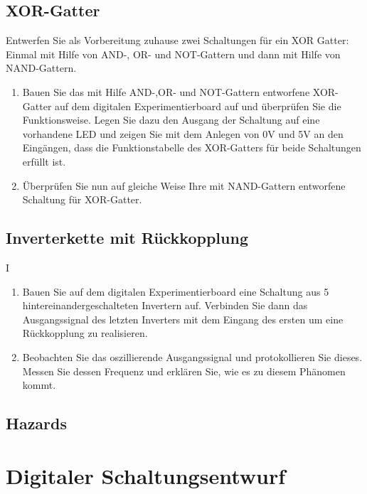 \documentclass[paper=a4, fontsize=11pt]{scrartcl}
\numberwithin{equation}{section}
\numberwithin{figure}{section}
\numberwithin{table}{section}
\begin{document}
\subsection{XOR-Gatter}

Entwerfen Sie als Vorbereitung zuhause zwei Schaltungen für ein XOR Gatter: Einmal mit Hilfe von AND-, OR- und NOT-Gattern und dann mit Hilfe von NAND-Gattern. \\

\begin{enumerate}
\item Bauen Sie das mit Hilfe AND-,OR- und NOT-Gattern entworfene XOR-Gatter auf dem digitalen Experimentierboard auf und überprüfen Sie die Funktionsweise. Legen Sie dazu den Ausgang der Schaltung auf eine vorhandene LED und zeigen Sie mit dem Anlegen von 0V und 5V an den Eingängen, dass die Funktionstabelle des XOR-Gatters für beide Schaltungen erfüllt ist. 
\item Überprüfen Sie nun auf gleiche Weise Ihre mit NAND-Gattern entworfene Schaltung für XOR-Gatter.
\end{enumerate}

\subsection{Inverterkette mit Rückkopplung}

I\begin{enumerate}
\item Bauen Sie auf dem digitalen Experimentierboard eine Schaltung aus 5 hintereinandergeschalteten Invertern auf. Verbinden Sie dann das Ausgangssignal des letzten Inverters mit dem Eingang des ersten um eine Rückkopplung zu realisieren.
\item Beobachten Sie das oszillierende Ausgangssignal und protokollieren Sie dieses. Messen Sie dessen Frequenz und erklären Sie, wie es zu diesem Phänomen kommt.
\end{enumerate}

\subsection{Hazards}


\newpage

\section{Digitaler Schaltungsentwurf}
\end{document}
